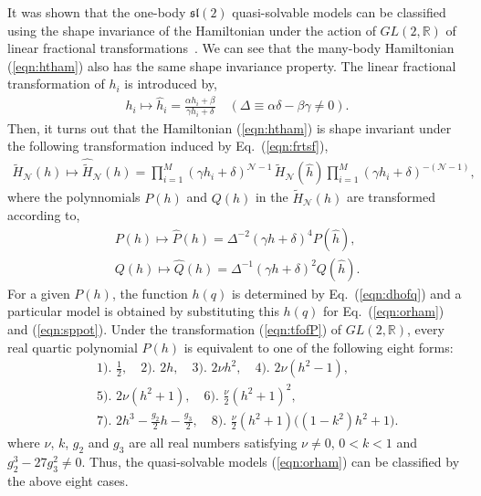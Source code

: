 \documentclass[a4paper,preprint,amsfonts,amssymb,amsmath,%
tightenlines,nofootinbib,noshowpacs]{revtex4}
\newcommand{\cN}{\mathcal{N}}
\newcommand{\bbR}{\mathbb{R}}
\newcommand{\Lsl}{\mathfrak{sl}}
\begin{document}
It was shown that the one-body $\Lsl (2)$ quasi-solvable models can
be classified using the shape invariance of the Hamiltonian
under the action of $GL(2,\bbR)$ of linear fractional
transformations~\cite{LoKaOl3,LoKaOl4}. We can see that the many-body
Hamiltonian (\ref{eqn:htham}) also has the same shape invariance
property. The linear fractional transformation of $h_{i}$ is
introduced by,
\begin{eqnarray}
h_{i}\mapsto\hat{h}_{i}=\frac{\alpha h_{i}+\beta}{\gamma h_{i}+\delta}
\quad (\Delta\equiv\alpha\delta -\beta\gamma\neq 0).
\label{eqn:frtsf}
\end{eqnarray}
Then, it turns out that the Hamiltonian (\ref{eqn:htham}) is
shape invariant under the following transformation induced by
Eq.~(\ref{eqn:frtsf}),
\begin{eqnarray}
\tilde{H}_{\cN}(h)\mapsto\widehat{\tilde{H}}_{\cN}(h)=
\prod_{i=1}^{M}(\gamma h_{i}+\delta)^{\cN -1}\,\tilde{H}_{\cN}
(\hat{h})\prod_{i=1}^{M}(\gamma h_{i}+\delta)^{-(\cN -1)},
\label{eqn:tfham}
\end{eqnarray}
where the polynnomials $P(h)$ and $Q(h)$ in the $\tilde{H}_{\cN}(h)$
are transformed according to,
\begin{subequations}
\label{eqns:tfpol}
\begin{eqnarray}
P(h)\mapsto\hat{P}(h)=\Delta^{-2}(\gamma h+\delta)^{4}P(\hat{h}),\\
\label{eqn:tfofP}
Q(h)\mapsto\hat{Q}(h)=\Delta^{-1}(\gamma h+\delta)^{2}Q(\hat{h}).
\label{eqn:tfofQ}
\end{eqnarray}
\end{subequations}
For a given $P(h)$, the function $h(q)$ is determined by
Eq.~(\ref{eqn:dhofq}) and a particular model is obtained by
substituting this $h(q)$ for Eq.~(\ref{eqn:orham}) and
(\ref{eqn:sppot}). Under the transformation (\ref{eqn:tfofP})
of $GL(2,\bbR)$, every real quartic polynomial $P(h)$ is equivalent
to one of the following eight forms:
\begin{eqnarray*}
&&\text{1). }\frac{1}{2},\quad\text{2). }2h,\quad\text{3). }2\nu h^{2},
\quad\text{4). }2\nu (h^{2}-1),\\
&&\text{5). }2\nu (h^{2}+1),\quad\text{6). }\frac{\nu}{2}(h^{2}+1)^{2},\\
&&\text{7). }2h^{3}-\frac{g_{2}}{2}h-\frac{g_{3}}{2},\quad\text{8). }
\frac{\nu}{2}(h^{2}+1)\bigl( (1-k^{2})h^{2}+1\bigr).
\end{eqnarray*}
where $\nu$, $k$, $g_{2}$ and $g_{3}$ are all real numbers satisfying
$\nu\neq 0$, $0<k<1$ and $g_{2}^{3}-27g_{3}^{2}\neq 0$.
Thus, the quasi-solvable models (\ref{eqn:orham}) can be classified
by the above eight cases.\\
\end{document}
